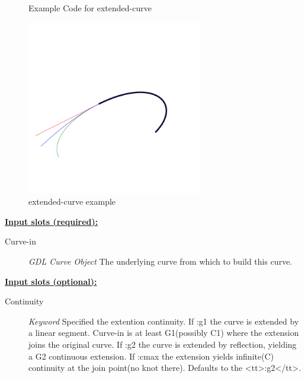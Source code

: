 \documentclass [11pt]{book}
\begin{document}
\begin{itemize}
\begin{figure}
\caption{Example Code for extended-curve}

\label{fig:example-code-extended-curve}

\end{figure}

\begin{figure}
\begin{center}
\includegraphics[width=3in,height=3in]{../images/example-extended-curve.pdf}
\end{center}

\caption{extended-curve example}

\label{fig:extended-curve}

\end{figure}





\textbf{
\underline{Input slots (required):}}

\begin{description}

\item [Curve-in]
\emph{GDL Curve Object} The underlying curve from which to build this curve.


\end{description}






\textbf{
\underline{Input slots (optional):}}

\begin{description}

\item [Continuity]
\emph{Keyword} Specified the extention continuity. If :g1 the curve is extended  by a linear segment. Curve-in is at least G1(possibly C1)
where the extension joins the original curve. If :g2 the curve is extended by reflection,  yielding a G2 continuous extension.
If :cmax  the extension yields infinite(C) continuity at the join point(no knot there). Defaults to the <tt>:g2</tt>.



\end{description}
\end{itemize}
\end{document}

